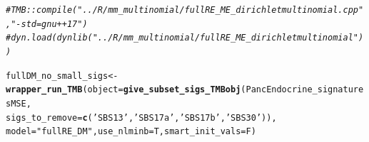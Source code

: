 \documentclass{article}\usepackage[]{graphicx}\usepackage[]{xcolor}
\makeatletter
\newcommand{\hlstr}[1]{\textcolor[rgb]{0.192,0.494,0.8}{#1}}%
\newcommand{\hlcom}[1]{\textcolor[rgb]{0.678,0.584,0.686}{\textit{#1}}}%
\newcommand{\hlstd}[1]{\textcolor[rgb]{0.345,0.345,0.345}{#1}}%
\newcommand{\hlkwb}[1]{\textcolor[rgb]{0.69,0.353,0.396}{#1}}%
\newcommand{\hlkwc}[1]{\textcolor[rgb]{0.333,0.667,0.333}{#1}}%
\newcommand{\hlkwd}[1]{\textcolor[rgb]{0.737,0.353,0.396}{\textbf{#1}}}%
\newenvironment{kframe}{%
 \def\at@end@of@kframe{}%
 \ifinner\ifhmode%
  \def\at@end@of@kframe{\end{minipage}}%
  \begin{minipage}{\columnwidth}%
 \fi\fi%
 \def\FrameCommand##1{\hskip\@totalleftmargin \hskip-\fboxsep
 \colorbox{shadecolor}{##1}\hskip-\fboxsep
     \hskip-\linewidth \hskip-\@totalleftmargin \hskip\columnwidth}%
 \MakeFramed {\advance\hsize-\width
   \@totalleftmargin\z@ \linewidth\hsize
   \@setminipage}}%
 {\par\unskip\endMakeFramed%
 \at@end@of@kframe}
\newenvironment{knitrout}{}{} %
\makeatother
\begin{document}
\begin{knitrout}
\color{fgcolor}\begin{kframe}
\begin{alltt}
\hlcom{# TMB::compile("../R/mm_multinomial/fullRE_ME_dirichletmultinomial.cpp",  "-std=gnu++17")}
\hlcom{# dyn.load(dynlib("../R/mm_multinomial/fullRE_ME_dirichletmultinomial"))}


\hlstd{fullDM_no_small_sigs} \hlkwb{<-} \hlkwd{wrapper_run_TMB}\hlstd{(}\hlkwc{object} \hlstd{=} \hlkwd{give_subset_sigs_TMBobj}\hlstd{(PancEndocrine_signaturesMSE,}
                           \hlkwc{sigs_to_remove} \hlstd{=} \hlkwd{c}\hlstd{(}\hlstr{'SBS13'}\hlstd{,} \hlstr{'SBS17a'}\hlstd{,} \hlstr{'SBS17b'}\hlstd{,} \hlstr{'SBS30'}\hlstd{)),}
                                        \hlkwc{model} \hlstd{=} \hlstr{"fullRE_DM"}\hlstd{,} \hlkwc{use_nlminb}\hlstd{=T,} \hlkwc{smart_init_vals}\hlstd{=F)}
\end{alltt}


{\ttfamily\noindent\bfseries{}}\end{kframe}
\end{knitrout}
\end{document}
